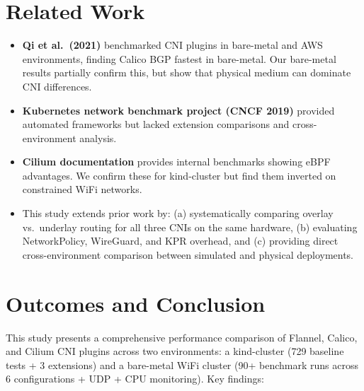 \documentclass[11pt,a4paper]{article}
\begin{document}
\section{Related Work}

\begin{itemize}
  \item \textbf{Qi et al.\ (2021)} benchmarked CNI plugins in bare-metal and AWS environments, finding Calico BGP fastest in bare-metal. Our bare-metal results partially confirm this, but show that physical medium can dominate CNI differences.
  \item \textbf{Kubernetes network benchmark project (CNCF 2019)} provided automated frameworks but lacked extension comparisons and cross-environment analysis.
  \item \textbf{Cilium documentation} provides internal benchmarks showing eBPF advantages. We confirm these for kind-cluster but find them inverted on constrained WiFi networks.
  \item This study extends prior work by: (a) systematically comparing overlay vs.\ underlay routing for all three CNIs on the same hardware, (b) evaluating NetworkPolicy, WireGuard, and KPR overhead, and (c) providing direct cross-environment comparison between simulated and physical deployments.
\end{itemize}

\section{Outcomes and Conclusion}

This study presents a comprehensive performance comparison of Flannel, Calico, and Cilium CNI plugins across two environments: a kind-cluster (729 baseline tests + 3 extensions) and a bare-metal WiFi cluster (90+ benchmark runs across 6 configurations + UDP + CPU monitoring). Key findings:
\end{document}
